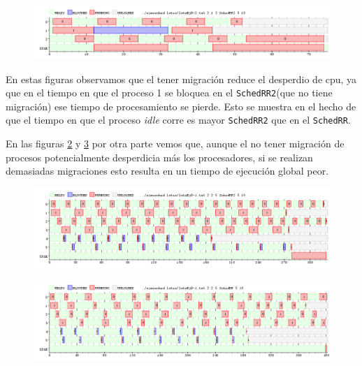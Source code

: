 \begin{figure}[H]
  \centering
  \includegraphics[width=1\textwidth]{img/imgEj8-2}
  \caption{}
  \label{fig:ej8-2}
\end{figure}

En estas figuras observamos que el tener migración reduce el desperdio de cpu, ya que en el tiempo en que el proceso 1 se bloquea en el \texttt{SchedRR2}(que no tiene migración) ese tiempo de procesamiento se pierde. Esto se muestra en el hecho de que el tiempo en que el proceso \emph{idle} corre es mayor \texttt{SchedRR2} que en el \texttt{SchedRR}.

En las figuras \ref{fig:ej8-3} y \ref{fig:ej8-4} por otra parte vemos que, aunque el no tener migración de procesos potencialmente desperdicia más los procesadores, si se realizan demasiadas migraciones esto resulta en un tiempo de ejecución global peor.

\begin{figure}[H]
  \centering
  \includegraphics[width=1\textwidth]{img/imgEj8-3}
  \caption{}
  \label{fig:ej8-3}
\end{figure}



\begin{figure}[H]
  \centering
  \includegraphics[width=1\textwidth]{img/imgEj8-4}
  \caption{}
  \label{fig:ej8-4}
\end{figure}











